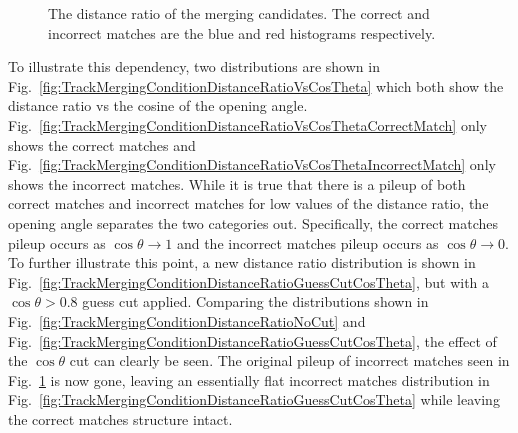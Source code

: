 \begin{figure}
  \centering
  \caption{The distance ratio of the merging candidates.  The correct and incorrect matches are the blue and red histograms respectively.}
  \label{fig:TrackMergingConditionDistanceRatio}
\end{figure}
To illustrate this dependency, two distributions are shown in Fig.~\ref{fig:TrackMergingConditionDistanceRatioVsCosTheta} which both show the distance ratio vs the cosine of the opening angle.  Fig.~\ref{fig:TrackMergingConditionDistanceRatioVsCosThetaCorrectMatch} only shows the correct matches and Fig.~\ref{fig:TrackMergingConditionDistanceRatioVsCosThetaIncorrectMatch} only shows the incorrect matches.  While it is true that there is a pileup of both correct matches and incorrect matches for low values of the distance ratio, the opening angle separates the two categories out.  Specifically, the correct matches pileup occurs as $\cos\theta \rightarrow 1$ and the incorrect matches pileup occurs as $\cos\theta \rightarrow 0$.  To further illustrate this point, a new distance ratio distribution is shown in Fig.~\ref{fig:TrackMergingConditionDistanceRatioGuessCutCosTheta}, but with a $\cos\theta > 0.8$ guess cut applied.  Comparing the distributions shown in Fig.~\ref{fig:TrackMergingConditionDistanceRatioNoCut} and Fig.~\ref{fig:TrackMergingConditionDistanceRatioGuessCutCosTheta}, the effect of the $\cos\theta$ cut can clearly be seen.  The original pileup of incorrect matches seen in Fig.~\ref{fig:TrackMergingConditionDistanceRatio} is now gone, leaving an essentially flat incorrect matches distribution in Fig.~\ref{fig:TrackMergingConditionDistanceRatioGuessCutCosTheta} while leaving the correct matches structure intact.  
